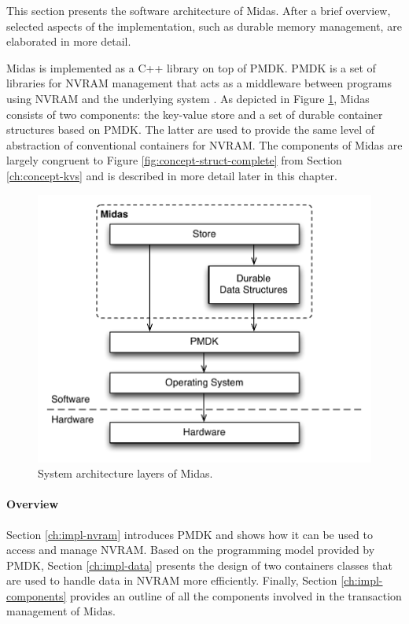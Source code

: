 This section presents the software architecture of Midas. After a brief
overview, selected aspects of the implementation, such as durable memory
management, are elaborated in more detail.

Midas is implemented as a C++ library on top of PMDK. PMDK is a set of libraries
for NVRAM management that acts as a middleware between programs using NVRAM and
the underlying system \cite{rudoff2017persistent, pmdk2018home}. As depicted in
Figure \ref{fig:impl-arch}, Midas consists of two components: the key-value
store and a set of durable container structures based on PMDK. The latter are
used to provide the same level of abstraction of conventional containers for
NVRAM. The components of Midas are largely congruent to Figure
\ref{fig:concept-struct-complete} from Section \ref{ch:concept-kvs} and is
described in more detail later in this chapter.

\begin{figure}[h!]
    \centering
    \includegraphics[scale=0.75]{figures/impl/arch2.pdf}
    \caption{System architecture layers of Midas.}
    \label{fig:impl-arch}
\end{figure}

\paragraph{Overview}

Section \ref{ch:impl-nvram} introduces PMDK and shows how it can be used to
access and manage NVRAM. Based on the programming model provided by PMDK,
Section \ref{ch:impl-data} presents the design of two containers classes that
are used to handle data in NVRAM more efficiently. Finally, Section
\ref{ch:impl-components} provides an outline of all the components involved in
the transaction management of Midas.

